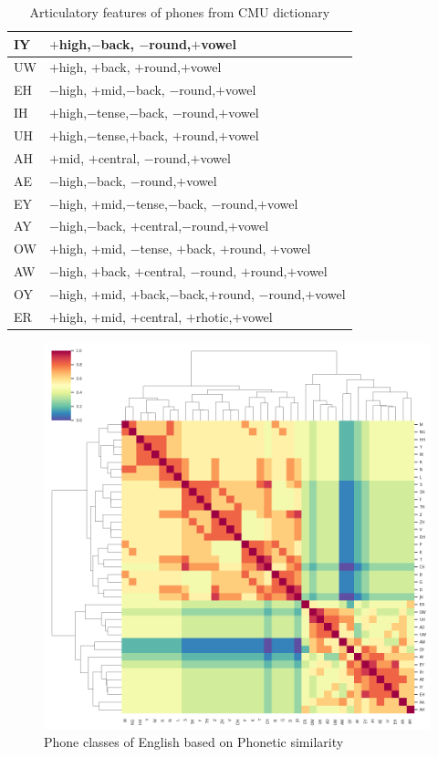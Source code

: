 \documentclass{article}
\begin{document}
\begin{table}[h!]
\begin{tabular}{|p{}|p{}|}
    IY & $+$high,$-$back, $-$round,$+$vowel \\ \hline
    UW & $+$high, $+$back, $+$round,$+$vowel \\ \hline
    EH & $-$high, $+$mid,$-$back, $-$round,$+$vowel \\ \hline
    IH & $+$high,$-$tense,$-$back, $-$round,$+$vowel \\ \hline
    UH & $+$high,$-$tense,$+$back, $+$round,$+$vowel \\ \hline
    AH & $+$mid, $+$central, $-$round,$+$vowel \\ \hline
    AE & $-$high,$-$back, $-$round,$+$vowel \\ \hline
    EY & $-$high, $+$mid,$-$tense,$-$back, $-$round,$+$vowel \\ \hline
    AY & $-$high,$-$back, $+$central,$-$round,$+$vowel\\ \hline
    OW & $+$high, $+$mid, $-$tense, $+$back, $+$round, $+$vowel \\ \hline
    AW & $-$high, $+$back, $+$central, $-$round, $+$round,$+$vowel \\ \hline
    OY & $-$high, $+$mid, $+$back,$-$back,$+$round, $-$round,$+$vowel \\ \hline
    ER & $+$high, $+$mid, $+$central, $+$rhotic,$+$vowel \\ \hline
\end{tabular}
\caption{Articulatory features of phones from CMU dictionary}
\label{table:phonefeat}
\end{table}

\begin{figure}[h!]
    \centering
    \includegraphics[scale=0.5]{phone-featuresimilarity.png}
    \caption{Phone classes of English based on Phonetic similarity}
    \label{fig:phonsim}
\end{figure}
\end{document}
